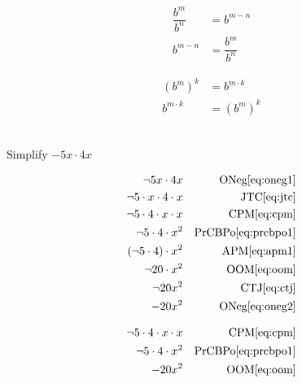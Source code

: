 \begin{arule}
\begin{subequations}
\begin{align}
	\dfrac{b^m}{b^n} &= b^{m-n} \label{eq:qcbpoo1}\\
	b^{m-n} &= \dfrac{b^m}{b^n} \label{eq:qcbpo2}
\end{align}
\end{subequations}
\end{arule}

\begin{arule}
\begin{subequations}
\begin{align}
	\left(b^m\right)^k &= b^{m \cdot k} \label{eq:popo1}\\
	b^{m \cdot k} &= \left( b^m \right)^k \label{eq:popo2}
\end{align}
\end{subequations}
\end{arule}

\begin{example}[id:20141108-191616] \label{20141108-191616}  \hfill \\

Simplify $-5x \cdot 4x$

\soln

\solnsteps
\begin{align*}
\neg 5x \cdot 4x && \text{ONeg} \eqref{eq:oneg1} \\
\neg 5 \cdot x \cdot 4 \cdot x && \text{JTC} \eqref{eq:jtc} \\
\neg 5 \cdot 4 \cdot x \cdot x && \text{CPM} \eqref{eq:cpm} \\
\neg 5 \cdot 4 \cdot x^2 && \text{PrCBPo} \eqref{eq:prcbpo1} \\
(\neg 5 \cdot 4) \cdot x^2 && \text{APM} \eqref{eq:apm1} \\
\neg 20 \cdot x^2 && \text{OOM} \eqref{eq:oom} \\
\neg 20 x^2 && \text{CTJ} \eqref{eq:ctj} \\
-20x^2 && \text{ONeg} \eqref{eq:oneg2} 
\end{align*}

\soln

\lesssteps
\begin{align*}
\neg 5 \cdot 4 \cdot x \cdot x && \text{CPM} \eqref{eq:cpm} \\
\neg 5 \cdot 4 \cdot x^2 && \text{PrCBPo} \eqref{eq:prcbpo1} \\
-20x^2 && \text{OOM} \eqref{eq:oom}  
\end{align*}

\end{example}


